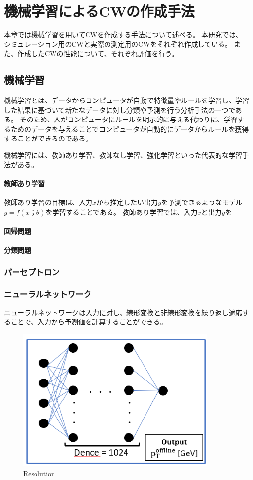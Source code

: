 \chapter{機械学習によるCWの作成手法}
本章では機械学習を用いてCWを作成する手法について述べる。
本研究では、シミュレーション用のCWと実際の測定用のCWをそれぞれ作成している。
また、作成したCWの性能について、それぞれ評価を行う。

\section{機械学習}
機械学習とは、データからコンピュータが自動で特徴量やルールを学習し、学習した結果に基づいて新たなデータに対し分類や予測を行う分析手法の一つである。
そのため、人がコンピュータにルールを明示的に与える代わりに、学習するためのデータを与えることでコンピュータが自動的にデータからルールを獲得することができるのである。

機械学習には、教師あり学習、教師なし学習、強化学習といった代表的な学習手法がある。
\subsubsection{教師あり学習}
教師あり学習の目標は、入力$x$から推定したい出力$y$を予測できるようなモデル$y = f(x；\theta)$を学習することである。
教師あり学習では、入力$x$と出力$y$を

\subsubsection{回帰問題}

\subsubsection{分類問題}


\subsection{パーセプトロン}

\subsection{ニューラルネットワーク}
ニューラルネットワークは入力に対し、線形変換と非線形変換を繰り返し適応することで、入力から予測値を計算することができる。
\begin{figure}[tb]
  \centering
  \includegraphics[clip, width=10cm]{fig/4/MLP.png}
  \caption{Resolution}
  \label{fig:Resolution}
\end{figure}


